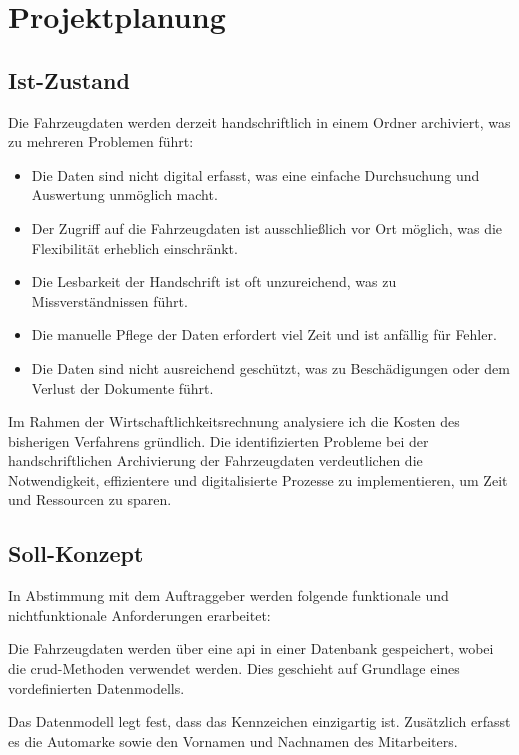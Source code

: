 \section{Projektplanung}

\subsection{Ist-Zustand} \label{Ist-Zustand}

Die Fahrzeugdaten werden derzeit handschriftlich in einem Ordner archiviert, was zu mehreren Problemen führt:

\begin{itemize}
    \item Die Daten sind nicht digital erfasst, was eine einfache Durchsuchung und Auswertung unmöglich macht.
    \item Der Zugriff auf die Fahrzeugdaten ist ausschließlich vor Ort möglich, was die Flexibilität erheblich einschränkt.
    \item Die Lesbarkeit der Handschrift ist oft unzureichend, was zu Missverständnissen führt.
    \item Die manuelle Pflege der Daten erfordert viel Zeit und ist anfällig für Fehler.
    \item Die Daten sind nicht ausreichend geschützt, was zu Beschädigungen oder dem Verlust der Dokumente führt.
\end{itemize}

Im Rahmen der Wirtschaftlichkeitsrechnung analysiere ich die Kosten des bisherigen Verfahrens gründlich. Die identifizierten Probleme bei der handschriftlichen Archivierung der Fahrzeugdaten verdeutlichen die Notwendigkeit, effizientere und digitalisierte Prozesse zu implementieren, um Zeit und Ressourcen zu sparen.

\subsection{Soll-Konzept} \label{Soll-Konzept}

In Abstimmung mit dem Auftraggeber werden folgende funktionale und nichtfunktionale Anforderungen erarbeitet:

Die Fahrzeugdaten werden über eine \gls{api} in einer Datenbank gespeichert, wobei die \gls{crud}-Methoden verwendet werden. Dies geschieht auf Grundlage eines vordefinierten Datenmodells.

Das Datenmodell legt fest, dass das Kennzeichen einzigartig ist. Zusätzlich erfasst es die Automarke sowie den Vornamen und Nachnamen des Mitarbeiters.

